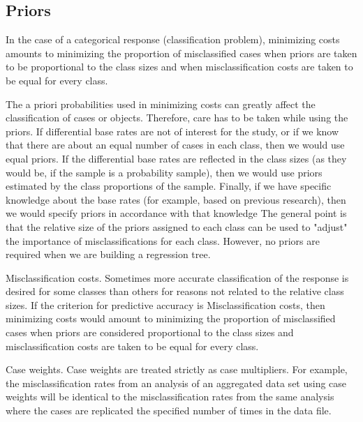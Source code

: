 


\subsection{Priors}In the case of a categorical response (classification problem), minimizing costs amounts to minimizing the proportion of misclassified cases when priors are taken to be proportional to the class sizes and when misclassification costs are taken to be equal for every class.

The a priori probabilities used in minimizing costs can greatly affect the classification of cases or objects. Therefore, care has to be taken while using the priors. If differential base rates are not of interest for the study, or if we know that there are about an equal number of cases in each class, then we would use equal priors. If the differential base rates are reflected in the class sizes (as they would be, if the sample is a probability sample), then we would use priors estimated by the class proportions of the sample. Finally, if we have specific knowledge about the base rates (for example, based on previous research), then we would specify priors in accordance with that knowledge The general point is that the relative size of the priors assigned to each class can be used to "adjust" the importance of misclassifications for each class. However, no priors are required when we are building a regression tree.

Misclassification costs. Sometimes more accurate classification of the response is desired for some classes than others for reasons not related to the relative class sizes. If the criterion for predictive accuracy is Misclassification costs, then minimizing costs would amount to minimizing the proportion of misclassified cases when priors are considered proportional to the class sizes and misclassification costs are taken to be equal for every class.

Case weights. Case weights are treated strictly as case multipliers. For example, the misclassification rates from an analysis of an aggregated data set using case weights will be identical to the misclassification rates from the same analysis where the cases are replicated the specified number of times in the data file.


